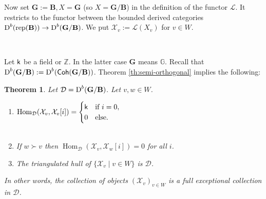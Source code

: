 \documentclass[sn-mathphys-num]{sn-jnl}%
\newcommand{\tX}{{\mathcal X}}
\newcommand{\Ll}{\mathcal L}
\newcommand{\D}{\mathcal D}
\newcommand{\rep}{{\mathrm{rep}}}
\newcommand*{\Dd}{\mathop{\mathrm D\kern0pt}\nolimits}
\newcommand*{\Hom}{\mathop{\mathrm {Hom}}\nolimits}
\newcommand*{\Coh}{\mathop{\sf {Coh}}\nolimits}
\newcommand{\sk}{{\sf k}}
\newcommand{\Gm}{\mathbb G}
\newcommand{\Z}{{\mathbb Z}}
\newcommand{\bg}{\mathbf G}
\newcommand{\fb}{\mathbf B}
\def\text#1{\mbox{#1}}
\newtheorem{theorem}{Theorem}[section]
\theoremstyle{definition}
\begin{document}
Now set $ \bg:= \fb, X= \bg$ (so $X= \bg/ \fb$) in the definition of the functor $\Ll$. It restricts to the functor between the bounded derived categories $\Dd ^b({\rep}({\fb}))\rightarrow \Dd ^b( \bg/ \fb)$. 
We put $\tX_v:=\Ll(X_v)$ for $v\in W$. 

\


Let $\sk$ be a field or $\Z$. In the latter case $\bg$ means $\Gm$. Recall that $\Dd^b ( \bg/\fb):=\Dd^b (\Coh( \bg/\fb))$.
Theorem \ref{th:semi-orthogonal} implies the following:

\begin{theorem}\label{th:coh-semi-orthogonal}Let $\D=\Dd^b (\bg/\fb)$.
Let $v,w\in W$.\\
\begin{enumerate}
\item $\Hom_\D(\tX_v,\tX_v[i])=\begin{cases}\sk &\text{if $i=0$},\\
0&\text{else.}\end{cases}$\\

\

\item If $w\succ  v$ then $\Hom_\D(\tX_v,\tX_w[i])=0$ for all $i$.\\
\item The triangulated hull of $\{\tX_v\mid v \in W\}$ is $\D$.
\end{enumerate}
In other words, the collection of objects $(\tX_v)_{v \in W}$ is a full exceptional collection in $ \D$.
\end{theorem}
\end{document}
